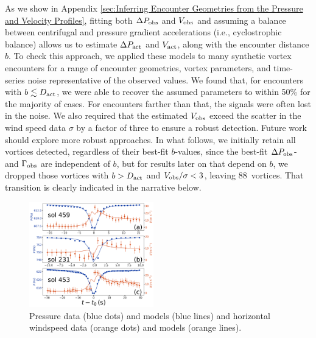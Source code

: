 \documentclass{aastex63}
\newcommand{\boverDactltone}{88}
\begin{document}
As we show in Appendix \ref{sec:Inferring Encounter Geometries from the Pressure and Velocity Profiles}, fitting both $\Delta P_{\rm obs}$ and $V_{\rm obs}$ and assuming a balance between centrifugal and pressure gradient accelerations (i.e., cyclostrophic balance) allows us to estimate $\Delta P_{\rm act}$ and $V_{\rm act}$, along with the encounter distance $b$. To check this approach, we applied these models to many synthetic vortex encounters for a range of encounter geometries, vortex parameters, and time-series noise representative of the observed values. We found that, for encounters with $b \lesssim D_{\rm act}$, we were able to recover the assumed parameters to within 50\% for the majority of cases. For encounters farther than that, the signals were often lost in the noise. We also required that the estimated $V_{\rm obs}$ exceed the scatter in the wind speed data $\sigma$ by a factor of three to ensure a robust detection. Future work should explore more robust approaches. In what follows, we initially retain all vortices detected, regardless of their best-fit $b$-values, since the best-fit $\Delta P_{\rm obs}$- and $\Gamma_{\rm obs}$ are independent of $b$, but for results later on that depend on $b$, we dropped those vortices with $b > D_{\rm act}$ and $V_{\rm obs}/\sigma < 3$, leaving \boverDactltone\ vortices. That transition is clearly indicated in the narrative below.

\begin{figure}
\centering
\includegraphics[width=0.48\textwidth]{figures/vortices_and_windspeed.png}
\caption{Pressure data (blue dots) and models (blue lines) and horizontal windspeed data (orange dots) and models (orange lines). \label{fig:vortices_and_windspeed}}
\end{figure}
\end{document}
